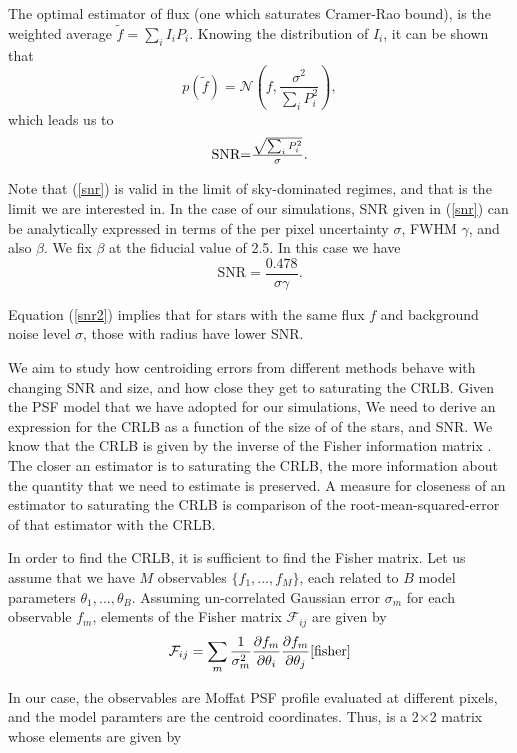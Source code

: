\documentclass[12pt, preprint]{aastex}
\newcommand{\beq}{\begin{equation}}
\newcommand{\eeq}{\end{equation}}
\begin{document}
The optimal estimator of flux (one which saturates Cramer-Rao bound),
is the weighted average $\tilde{f}=\sum_{i}I_{i}P_{i}$. Knowing the
distribution of $I_{i}$, it can be shown that 
\beq
p(\tilde{f}) = \mathcal{N}(f , \frac{\sigma^{2}}{\sum_{i}P_{i}^{2}}),
\eeq  
which leads us to
\beq
\begin{array}{l}
\text{SNR} $=$ \frac{\sqrt{\sum_{i} P_{i}^{2}}}{\sigma}.
\end{array}
\label{snr}
\eeq

Note that (\ref{snr}) is valid in the limit of sky-dominated regimes,
and that is the limit we are interested in. In the case of our simulations,
SNR given in (\ref{snr}) can be analytically expressed in terms of the per pixel uncertainty
$\sigma$, FWHM $\gamma$, and also $\beta$. We fix $\beta$ at the fiducial value of 2.5.
In this case we have
\beq
\text{SNR} = \frac{0.478}{\sigma \gamma}.
\label{snr2}
\eeq

Equation (\ref{snr2}) implies that for stars with the same flux $f$ and background
noise level $\sigma$, those with radius have lower SNR.

We aim to study how centroiding errors from different methods behave with
changing SNR and size, and how close they get to saturating the CRLB. 
Given the PSF model that we have adopted for our simulations, We need 
to derive an expression for the CRLB as a function of the size of of
the stars, and SNR. We know that the CRLB is given by the inverse of 
the Fisher information matrix . The closer an estimator is
to saturating the CRLB, the more information about the quantity that we 
need to estimate is preserved. A measure for closeness of an estimator to 
saturating the CRLB is comparison of the root-mean-squared-error of that estimator 
with the CRLB.

In order to find the CRLB, it is sufficient to find the Fisher matrix.
Let us assume that we have $M$ observables $\{f_{1}, ... , f_{M}\}$, each
related to $B$ model parameters $\theta_{1} , ... , \theta_{B}$. Assuming
un-correlated Gaussian error $\sigma_{m}$ for each observable $f_{m}$, elements
of the Fisher matrix $\mathcal{F}_{ij}$ are given by
\beq
\mathcal{F}_{ij} = \sum_{m}\frac{1}{\sigma_{m}^{2}}\frac{\partial f_{m}}{\partial \theta_{i}}\frac{\partial f_{m}}{\partial \theta_{j}}
\ref{fisher}
\eeq

In our case, the observables are Moffat PSF profile evaluated at different pixels, and  
the model paramters are the centroid coordinates. Thus, 
is a 2$\times$2 matrix whose elements are given by
\end{document}

